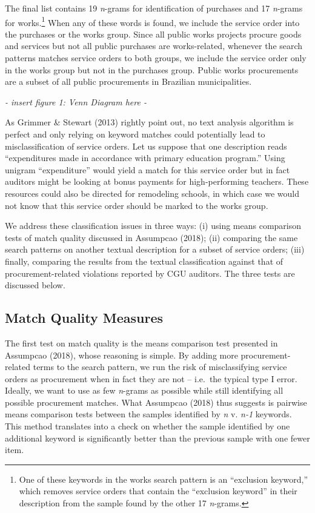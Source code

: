 \documentclass[]{article}
\let\rmarkdownfootnote\footnote%
\def\footnote{\protect\rmarkdownfootnote}
\theoremstyle{definition}
\theoremstyle{definition}
\theoremstyle{definition}
\theoremstyle{remark}
\begin{document}
The final list contains 19 \emph{n}-grams for identification of
purchases and 17 \emph{n}-grams for works.\footnote{One of these
  keywords in the works search pattern is an ``exclusion keyword,''
  which removes service orders that contain the ``exclusion keyword'' in
  their description from the sample found by the other 17
  \emph{n}-grams.} When any of these words is found, we include the
service order into the purchases or the works group. Since all public
works projects procure goods and services but not all public purchases
are works-related, whenever the search patterns matches service orders
to both groups, we include the service order only in the works group but
not in the purchases group. Public works procurements are a subset of
all public procurements in Brazilian municipalities.

\emph{- insert figure 1: Venn Diagram here -}

As Grimmer \& Stewart (2013) rightly point out, no text analysis
algorithm is perfect and only relying on keyword matches could
potentially lead to misclassification of service orders. Let us suppose
that one description reads ``expenditures made in accordance with
primary education program.'' Using unigram ``expenditure'' would yield a
match for this service order but in fact auditors might be looking at
bonus payments for high-performing teachers. These resources could also
be directed for remodeling schools, in which case we would not know that
this service order should be marked to the works group.

We address these classification issues in three ways: (i) using means
comparison tests of match quality discussed in Assumpcao (2018); (ii)
comparing the same search patterns on another textual description for a
subset of service orders; (iii) finally, comparing the results from the
textual classification against that of procurement-related violations
reported by CGU auditors. The three tests are discussed below.

\hypertarget{quality1}{%
\subsection{Match Quality Measures}\label{quality1}}

The first test on match quality is the means comparison test presented
in Assumpcao (2018), whose reasoning is simple. By adding more
procurement-related terms to the search pattern, we run the risk of
misclassifying service orders as procurement when in fact they are not
-- i.e.~the typical type I error. Ideally, we want to use as few
\emph{n}-grams as possible while still identifying all possible
procurement matches. What Assumpcao (2018) thus suggests is pairwise
means comparison tests between the samples identified by \emph{n} v.
\emph{n-1} keywords. This method translates into a check on whether the
sample identified by one additional keyword is significantly better than
the previous sample with one fewer item.
\end{document}
